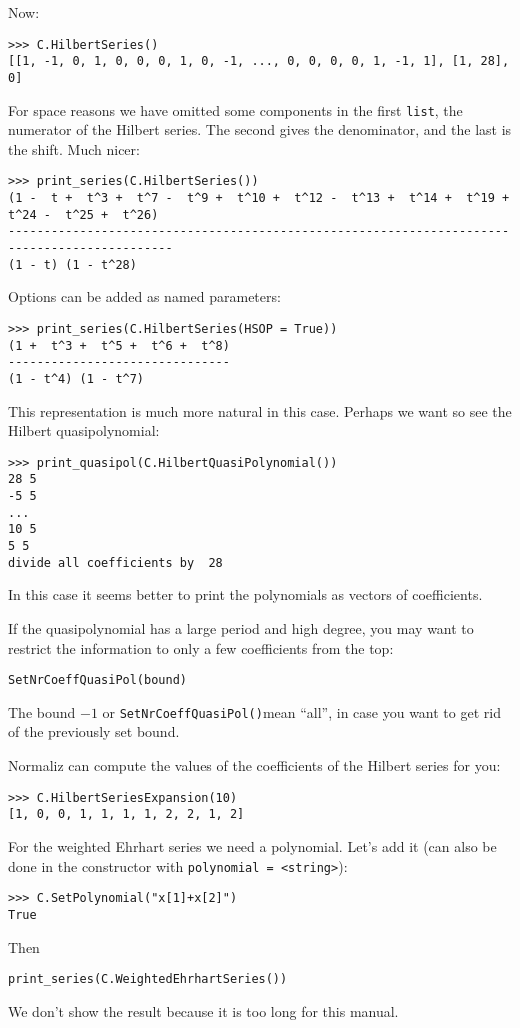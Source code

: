 \documentclass[12pt,a4paper]{scrartcl}
\theoremstyle{definition}
\begin{document}
\begin{small}
Now:
\begin{Verbatim}
>>> C.HilbertSeries()
[[1, -1, 0, 1, 0, 0, 0, 1, 0, -1, ..., 0, 0, 0, 0, 1, -1, 1], [1, 28], 0]
\end{Verbatim}
For space reasons we have omitted some components in the first \verb|list|, the numerator of the Hilbert series. The second gives the denominator, and the last is the shift. Much nicer:
\begin{Verbatim}
>>> print_series(C.HilbertSeries())
(1 -  t +  t^3 +  t^7 -  t^9 +  t^10 +  t^12 -  t^13 +  t^14 +  t^19 +  t^24 -  t^25 +  t^26)
---------------------------------------------------------------------------------------------
(1 - t) (1 - t^28) 
\end{Verbatim}

Options can be added as named parameters:
\begin{Verbatim}
>>> print_series(C.HilbertSeries(HSOP = True))
(1 +  t^3 +  t^5 +  t^6 +  t^8)
-------------------------------
(1 - t^4) (1 - t^7)   
\end{Verbatim}
This representation is much more natural in this case. Perhaps we want so see the Hilbert quasipolynomial:
\begin{Verbatim}
>>> print_quasipol(C.HilbertQuasiPolynomial())
28 5
-5 5
...
10 5
5 5
divide all coefficients by  28
\end{Verbatim}
In this case it seems better to print the polynomials as vectors of coefficients.

If the quasipolynomial has a large period and high degree, you may want to restrict the information to only a few coefficients from the top:
\begin{Verbatim}
SetNrCoeffQuasiPol(bound)
\end{Verbatim}
The bound $-1$ or \verb|SetNrCoeffQuasiPol()|mean ``all'', in case you want to get rid of the previously set bound.

Normaliz can compute the values of the coefficients of the Hilbert series for you:
\begin{Verbatim}
>>> C.HilbertSeriesExpansion(10)
[1, 0, 0, 1, 1, 1, 1, 2, 2, 1, 2]
\end{Verbatim}

For the weighted Ehrhart series we need a polynomial. Let's add it (can also be done in the constructor with \verb|polynomial = <string>|):
\begin{Verbatim}
>>> C.SetPolynomial("x[1]+x[2]")
True
\end{Verbatim}
Then
\begin{Verbatim}
print_series(C.WeightedEhrhartSeries())
\end{Verbatim}
We don't show the result because it is too long for this manual.


\end{small}
\end{document}
